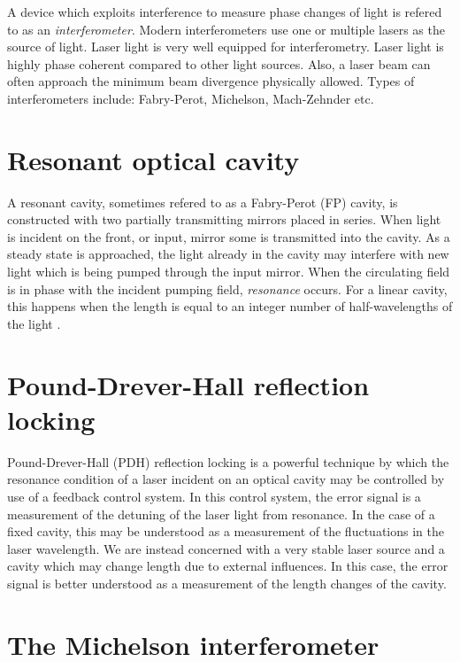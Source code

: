A device which exploits interference to measure phase changes of light is refered to as an \emph{interferometer}. %
Modern interferometers use one or multiple lasers as the source of light. %
Laser light is very well equipped for interferometry. %
Laser light is highly phase coherent compared to other light sources. %
Also, a laser beam can often approach the minimum beam divergence physically allowed. %
Types of interferometers include: Fabry-Perot, Michelson, Mach-Zehnder etc.

\section{Resonant optical cavity}
A resonant cavity, sometimes refered to as a Fabry-Perot (FP) cavity, is constructed with two partially transmitting mirrors placed in series. %
When light is incident on the front, or input, mirror some is transmitted into the cavity. %
As a steady state is approached, the light already in the cavity may interfere with new light which is being pumped through the input mirror. %
When the circulating field is in phase with the incident pumping field, \emph{resonance} occurs. %
For a linear cavity, this happens when the length is equal to an integer number of half-wavelengths of the light \cite{Siegman}.


\section{Pound-Drever-Hall reflection locking}
\cite{PDH}
Pound-Drever-Hall (PDH) reflection locking is a powerful technique by which the resonance condition of a laser incident on an optical cavity may be controlled by use of a feedback control system. %
In this control system, the error signal is a measurement of the detuning of the laser light from resonance. %
In the case of a fixed cavity, this may be understood as a measurement of the fluctuations in the laser wavelength. %
We are instead concerned with a very stable laser source and a cavity which may change length due to external influences. %
In this case, the error signal is better understood as a measurement of the length changes of the cavity.



\section{The Michelson interferometer}

